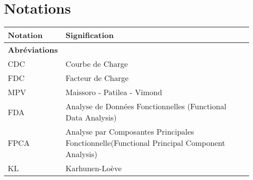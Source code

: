 \section*{Notations}
\thispagestyle{empty}
\begin{tabularx}{\textwidth}{lX}
	\toprule
	\textbf{Notation}                                                & \textbf{Signification}                                                                                                                                                                                     \\
	\midrule
	\textbf{Abréviations}                                                                                                                                                                                                                                                         \\
	\midrule
	CDC                                                              & Courbe de Charge                                                                                                                                                                                           \\
	FDC                                                              & Facteur de Charge                                                                                                                                                                                          \\
	MPV                                                              & Maissoro - Patilea - Vimond                                                                                                                                                                                \\
	FDA                                                              & Analyse de Données Fonctionnelles (Functional Data Analysis)                                                                                                                                               \\
	FPCA                                                             & Analyse par Composantes Principales Fonctionnelle(Functional Principal Component Analysis)                                                                                                                 \\
	KL                                                               & Karhunen-Loève                                                                                                                                                                                             \\

\end{tabularx}
